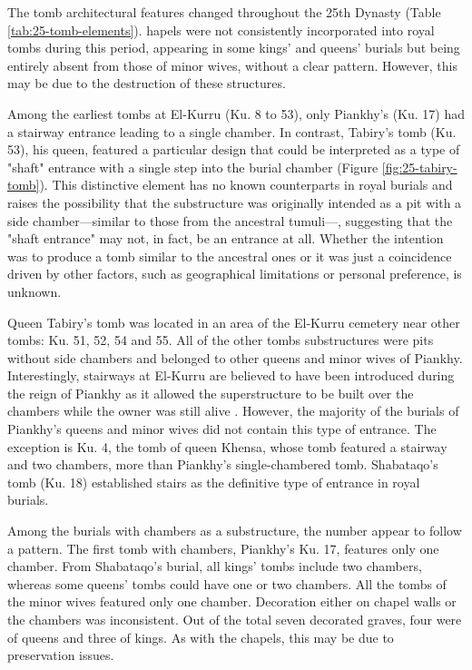 The tomb architectural features changed throughout the 25th Dynasty (Table \ref{tab:25-tomb-elements}). hapels were not consistently incorporated into royal tombs during this period, appearing in some kings' and queens' burials but being entirely absent from those of minor wives, without a clear pattern. However, this may be due to the destruction of these structures.


Among the earliest tombs at El-Kurru (Ku. 8 to 53), only Piankhy's (Ku. 17) had a stairway entrance leading to a single chamber. In contrast, Tabiry's tomb (Ku. 53), his queen, featured a particular design that could be interpreted as a type of "shaft" entrance with a single step into the burial chamber (Figure \ref{fig:25-tabiry-tomb}). This distinctive element has no known counterparts in royal burials and raises the possibility that the substructure was originally intended as a pit with a side chamber---similar to those from the ancestral tumuli---, suggesting that the "shaft entrance" may not, in fact, be an entrance at all. Whether the intention was to produce a tomb similar to the ancestral ones or it was just a coincidence driven by other factors, such as geographical limitations or personal preference, is unknown.


Queen Tabiry's tomb was located in an area of the El-Kurru cemetery near other tombs: Ku. 51, 52, 54 and 55. All of the other tombs substructures were pits without side chambers and belonged to other queens and minor wives of Piankhy. Interestingly, stairways at El-Kurru are believed to have been introduced during the reign of Piankhy as it allowed the superstructure to be built over the chambers while the owner was still alive \parencites[p.~623]{lohwasserNapatanNecropoleisBurial2019}. However, the majority of the burials of Piankhy's queens and minor wives did not contain this type of entrance. The exception is Ku. 4, the tomb of queen Khensa, whose tomb featured a stairway and two chambers, more than Piankhy's single-chambered tomb. Shabataqo's tomb (Ku. 18) established stairs as the definitive type of entrance in royal burials.


Among the burials with chambers as a substructure, the number appear to follow a pattern. The first tomb with chambers, Piankhy's Ku. 17, features only one chamber. From Shabataqo's burial, all kings' tombs include two chambers, whereas some queens' tombs could have one or two chambers. All the tombs of the minor wives featured only one chamber. Decoration either on chapel walls or the chambers was inconsistent. Out of the total seven decorated graves, four were of queens and three of kings. As with the chapels, this may be due to preservation issues.


